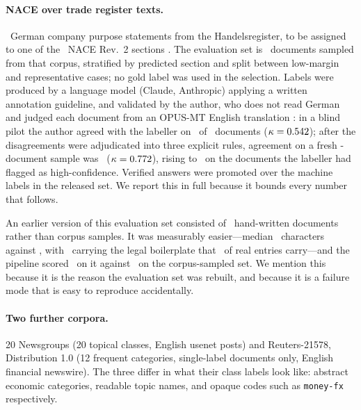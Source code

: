 \documentclass[11pt]{article}
\begin{document}
\paragraph{NACE over trade register texts.}
\CorpusSize\ German company purpose statements from the Handelsregister, to be
assigned to one of the \NSections\ NACE Rev.~2 sections
\citep{eurostat-nace-2008}. The evaluation set is
\NEVAL\ documents sampled from that corpus, stratified by predicted section and
split between low-margin and representative cases; no gold label was used in the
selection. Labels were produced by a language model (Claude, Anthropic) applying
a written annotation guideline, and validated by the author, who does not read
German and judged each document from an OPUS-MT English translation
\citep{tiedemann-thottingal-2020-opus}: in a blind pilot the author agreed with
the labeller on \PilotAgree\ of \PilotN\ documents ($\kappa = 0.542$); after the
disagreements were adjudicated into three explicit rules, agreement on a fresh
\VerifyN-document sample was \VerifyAgree\ ($\kappa = 0.772$), rising to
\VerifyHighAgree\ on the documents
the labeller had flagged as high-confidence. Verified answers were promoted over
the machine labels in the released set. We report this in full because it
bounds every number that follows.

An earlier version of this evaluation set consisted of \RetiredN\ hand-written
documents rather than corpus samples. It was measurably easier---median
\RetiredMedianChars\ characters against \CorpusMedianChars, with
\RetiredBoilerplate\ carrying the legal boilerplate that \CorpusBoilerplate\ of
real entries carry---and the pipeline scored \RetiredTopOne\ on it against
\OldTaxonomyTopOne\ on the corpus-sampled set. We mention this because it is
the reason the evaluation set was rebuilt, and because it is a failure mode that is easy to reproduce
accidentally.

\paragraph{Two further corpora.}
20 Newsgroups \citep{lang-1995-newsweeder} (20 topical classes, English usenet
posts) and Reuters-21578, Distribution 1.0 \citep{lewis-1987-reuters} (12
frequent categories, single-label documents only, English financial newswire).
The three differ in what their class labels look like: abstract economic
categories, readable topic names, and opaque codes such as \texttt{money-fx}
respectively.
\end{document}
